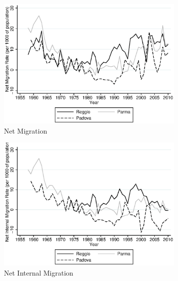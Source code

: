 \begin{figure}[H]
\begin{subfigure}[t]{0.49\textwidth}
          \includegraphics[width=\textwidth]{../../output/image/netmigration.eps}       
\caption{Net Migration}        
        \end{subfigure}
        \begin{subfigure}[t]{0.49\textwidth}
          \includegraphics[width=\textwidth]{../../output/image/netinternalmig.eps}       
 \caption{Net Internal Migration}        
        \end{subfigure}
        \begin{subfigure}[t]{0.48\textwidth}

\end{subfigure}
\end{figure}

